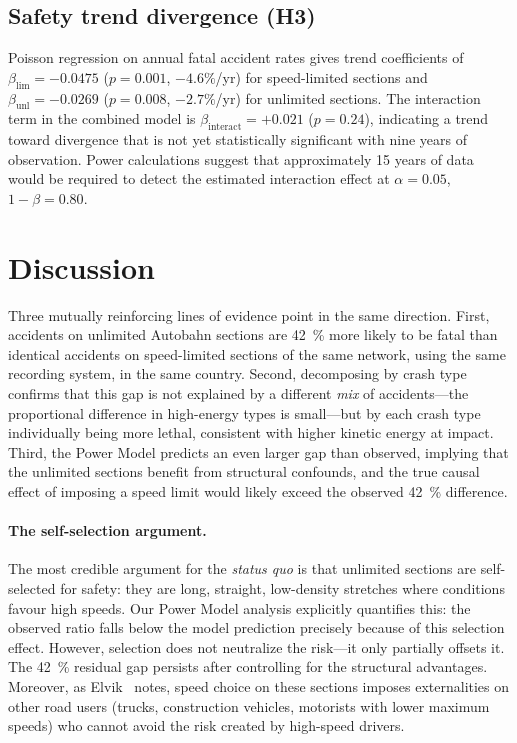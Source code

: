 \documentclass[aps,prl,twocolumn,superscriptaddress,longbibliography]{revtex4-2}
\begin{document}
\subsection{Safety trend divergence (H3)}

Poisson regression on annual fatal accident rates gives trend coefficients of
$\beta_\mathrm{lim} = -0.0475$ ($p = 0.001$, $-4.6\%$/yr) for speed-limited
sections and $\beta_\mathrm{unl} = -0.0269$ ($p = 0.008$, $-2.7\%$/yr) for
unlimited sections.
The interaction term in the combined model is $\beta_\mathrm{interact} = +0.021$
($p = 0.24$), indicating a trend toward divergence that is not yet statistically
significant with nine years of observation.
Power calculations suggest that approximately 15 years of data would be required
to detect the estimated interaction effect at $\alpha = 0.05$, $1-\beta = 0.80$.

\section{Discussion}

Three mutually reinforcing lines of evidence point in the same direction.
First, accidents on unlimited Autobahn sections are \SI{42}{\percent} more likely
to be fatal than identical accidents on speed-limited sections of the same network,
using the same recording system, in the same country.
Second, decomposing by crash type confirms that this gap is not explained by a
different \emph{mix} of accidents---the proportional difference in high-energy
types is small---but by each crash type individually being more lethal, consistent
with higher kinetic energy at impact.
Third, the Power Model predicts an even larger gap than observed, implying that
the unlimited sections benefit from structural confounds, and the true causal
effect of imposing a speed limit would likely exceed the observed \SI{42}{\percent}
difference.

\paragraph{The self-selection argument.}
The most credible argument for the \textit{status quo} is that unlimited sections
are self-selected for safety: they are long, straight, low-density stretches
where conditions favour high speeds.
Our Power Model analysis explicitly quantifies this: the observed ratio falls
below the model prediction precisely because of this selection effect.
However, selection does not neutralize the risk---it only partially offsets it.
The \SI{42}{\percent} residual gap persists after controlling for the structural
advantages.
Moreover, as Elvik~\cite{Elvik2010} notes, speed choice on these sections
imposes externalities on other road users (trucks, construction vehicles, motorists
with lower maximum speeds) who cannot avoid the risk created by high-speed
drivers.
\end{document}
